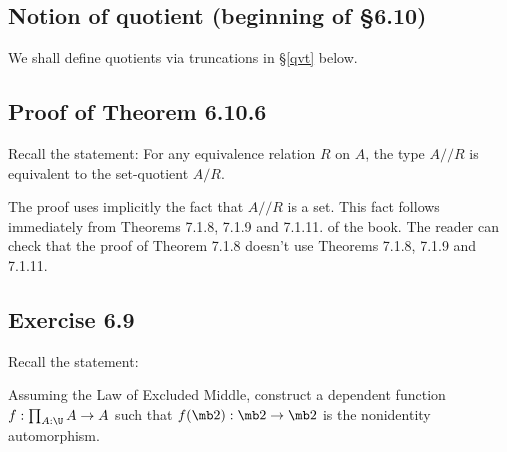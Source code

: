 \documentclass[12pt]{article}
\begin{document}
\subsection{Notion of quotient (beginning of \S6.10)}\label{610}

We shall define quotients via truncations in \S\ref{qvt} below.

\begin{comment}

To spell out the induction principle for the quotient $A/R$, let $\alpha(a,b):q(a)=q(b)$ be the path given from $q(a)$ to $q(b)$ whenever $R(a,b)$. 

Given $P:A/R\to\Set$ together with $f:\prod_{a:A}P(q(a))$ and 
$$
\beta(a,b):f(a)=^P_{\alpha(a,b)}f(b)
$$ 
for all $a,b$ such that $R(a,b)$, we have a $g:\prod_{x:A/R}P(x)$ such that $g(q(a))\equiv f(a)$ for all $a:A$, and $\apd_g(\alpha(a,b))=\beta(a,b)$ for all $a,b$ such that $R(a,b)$.

It is easy to see that if our type family $P:A/R\to\Set$ is such that $P(q(b))$ is a mere proposition whenever $R(a,b)$, and if we are just given an $f:\prod_{a:A}P(q(a))$, then we get a $g:\prod_{x:A/R}P(x)$ such that $g(q(a))\eq f(a)$ for all $a:A$.

\end{comment}


\subsection{Proof of Theorem 6.10.6}

Recall the statement: For any equivalence relation $R$ on $A$, the type $A/\!\!/R$ is equivalent to the set-quotient $A/R$.

The proof uses implicitly the fact that $A/\!\!/R$ is a set. This fact follows immediately from Theorems 7.1.8, 7.1.9 and 7.1.11. of the book. The reader can check that the proof of Theorem 7.1.8 doesn't use Theorems 7.1.8, 7.1.9 and 7.1.11.


\subsection{Exercise 6.9}


Recall the statement:

Assuming the Law of Excluded Middle, construct a dependent function $f:\prod_{A:\U}A\to A$ such that $f(\mb2):\mb2\to\mb2$ is the nonidentity automorphism.
\end{document}

